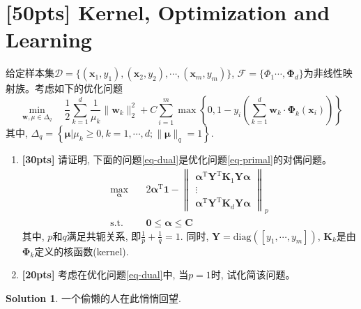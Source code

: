 \documentclass[a4paper,UTF8]{article}
\numberwithin{equation}{section}
\theoremstyle{definition}
\newtheorem*{solution}{Solution}
\begin{document}
\section{[50pts] Kernel, Optimization and Learning}
给定样本集$\mathcal{D} = \{(\mathbf{x}_1,y_1),(\mathbf{x}_2,y_2),\cdots,(\mathbf{x}_m,y_m)\}$, $\mathcal{F} = \{\Phi_1 \cdots,\bm \Phi_d\}$为非线性映射族。考虑如下的优化问题
\begin{equation}
\label{eq-primal}
\min_{\mathbf w, \mu\in \Delta_q} \quad \frac{1}{2} \sum_{k=1}^d \frac{1}{\mu_k}\lVert\mathbf w_k\rVert_2^2 + C\sum_{i=1}^m \max\left\lbrace 0,1 - y_i\left(\sum_{k=1}^d \mathbf w_k \cdot \bm \Phi_k(\mathbf{x}_i)\right) \right\rbrace
\end{equation}
其中, $\Delta_q = \left\lbrace \bm{ \mu} | \mu_k\geq 0, k=1,\cdots,d; \lVert \bm{ \mu} \rVert_q = 1\right\rbrace$.

\begin{enumerate}[(1)]
\item{ \textbf{[30pts]} 请证明, 下面的问题\ref{eq-dual}是优化问题\ref{eq-primal}的对偶问题。
\begin{equation}
\label{eq-dual}
	\begin{split}
\max_{\bm \alpha} &\quad 2\bm \alpha^\mathrm T \mathbf{1}- \left\lVert
 \begin{matrix}
   \bm \alpha^\mathrm{T}\mathbf Y^\mathrm{T} \mathbf K_1 \mathbf Y  \bm \alpha \\
   \vdots \\
  \bm \alpha^\mathrm{T}\mathbf Y^\mathrm{T} \mathbf K_d \mathbf Y  \bm \alpha 
  \end{matrix}
  \right\rVert_p\\
  \text{s.t.} &\quad  \mathbf{0} \leq \bm \alpha  \leq \mathbf{C} 
  \end{split}
\end{equation}
其中, $p$和$q$满足共轭关系, 即$\frac{1}{p}+\frac{1}{q}=1$. 同时, $\mathbf Y = \text{diag}([y_1,\cdots,y_m])$, $\mathbf K_k$是由$\bm \Phi_k$定义的核函数(kernel).}
\item{ \textbf{[20pts]} 考虑在优化问题\ref{eq-dual}中, 当$p=1$时, 试化简该问题。}
\end{enumerate}

\begin{solution}
一个偷懒的人在此悄悄回望.
~\\
~\\
~\\
\end{solution}
\end{document}
